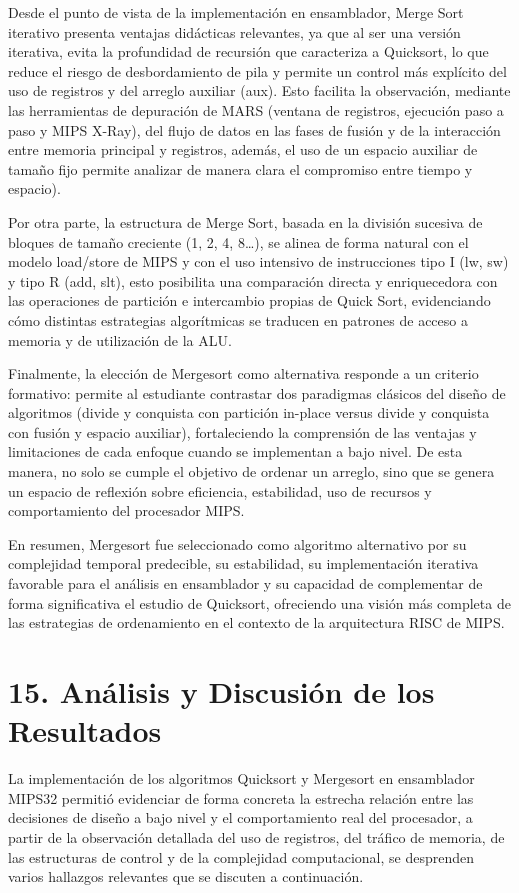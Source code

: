 \documentclass[12pt, letterpaper]{article}
\begin{document}
Desde el punto de vista de la implementación en ensamblador, Merge Sort iterativo presenta ventajas didácticas relevantes, ya que al ser una versión iterativa, evita la profundidad de recursión que caracteriza a Quicksort, lo que reduce el riesgo de desbordamiento de pila y permite un control más explícito del uso de registros y del arreglo auxiliar (aux). Esto facilita la observación, mediante las herramientas de depuración de MARS (ventana de registros, ejecución paso a paso y MIPS X-Ray), del flujo de datos en las fases de fusión y de la interacción entre memoria principal y registros, además, el uso de un espacio auxiliar de tamaño fijo permite analizar de manera clara el compromiso entre tiempo y espacio).

Por otra parte, la estructura de Merge Sort, basada en la división sucesiva de bloques de tamaño creciente (1, 2, 4, 8…), se alinea de forma natural con el modelo load/store de MIPS y con el uso intensivo de instrucciones tipo I (lw, sw) y tipo R (add, slt), esto posibilita una comparación directa y enriquecedora con las operaciones de partición e intercambio propias de Quick Sort, evidenciando cómo distintas estrategias algorítmicas se traducen en patrones de acceso a memoria y de utilización de la ALU.

Finalmente, la elección de Mergesort como alternativa responde a un criterio formativo: permite al estudiante contrastar dos paradigmas clásicos del diseño de algoritmos (divide y conquista con partición in-place versus divide y conquista con fusión y espacio auxiliar), fortaleciendo la comprensión de las ventajas y limitaciones de cada enfoque cuando se implementan a bajo nivel. De esta manera, no solo se cumple el objetivo de ordenar un arreglo, sino que se genera un espacio de reflexión sobre eficiencia, estabilidad, uso de recursos y comportamiento del procesador MIPS.

En resumen, Mergesort fue seleccionado como algoritmo alternativo por su complejidad temporal predecible, su estabilidad, su implementación iterativa favorable para el análisis en ensamblador y su capacidad de complementar de forma significativa el estudio de Quicksort, ofreciendo una visión más completa de las estrategias de ordenamiento en el contexto de la arquitectura RISC de MIPS.\newpage
\section*{15. Análisis y Discusión de los Resultados}

La implementación de los algoritmos Quicksort y Mergesort en ensamblador MIPS32 permitió evidenciar de forma concreta la estrecha relación entre las decisiones de diseño a bajo nivel y el comportamiento real del procesador, a partir de la observación detallada del uso de registros, del tráfico de memoria, de las estructuras de control y de la complejidad computacional, se desprenden varios hallazgos relevantes que se discuten a continuación.
\end{document}

